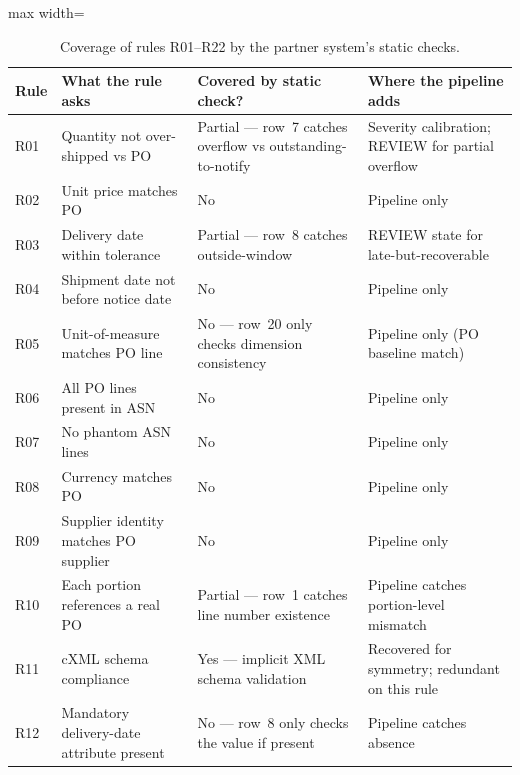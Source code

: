\begin{table}[htbp]
\centering
\caption{Coverage of rules R01--R22 by the partner system's static checks.}
\label{tab:app:coverage}
\scriptsize
\begin{adjustbox}{max width=\textwidth}
\begin{tabular}{@{}lp{5cm}p{5cm}p{4.5cm}@{}}
\toprule
\textbf{Rule} & \textbf{What the rule asks} & \textbf{Covered by static check?} & \textbf{Where the pipeline adds} \\
\midrule
R01 & Quantity not over-shipped vs PO              & Partial --- row~7 catches overflow vs outstanding-to-notify & Severity calibration; REVIEW for partial overflow \\
R02 & Unit price matches PO                        & No                                                          & Pipeline only \\
R03 & Delivery date within tolerance               & Partial --- row~8 catches outside-window                    & REVIEW state for late-but-recoverable \\
R04 & Shipment date not before notice date         & No                                                          & Pipeline only \\
R05 & Unit-of-measure matches PO line              & No --- row~20 only checks dimension consistency             & Pipeline only (PO baseline match) \\
R06 & All PO lines present in ASN                  & No                                                          & Pipeline only \\
R07 & No phantom ASN lines                         & No                                                          & Pipeline only \\
R08 & Currency matches PO                          & No                                                          & Pipeline only \\
R09 & Supplier identity matches PO supplier        & No                                                          & Pipeline only \\
R10 & Each portion references a real PO            & Partial --- row~1 catches line number existence             & Pipeline catches portion-level mismatch \\
R11 & cXML schema compliance                       & Yes --- implicit XML schema validation                      & Recovered for symmetry; redundant on this rule \\
R12 & Mandatory delivery-date attribute present    & No --- row~8 only checks the value if present               & Pipeline catches absence \\

\end{tabular}
\end{adjustbox}
\end{table}
